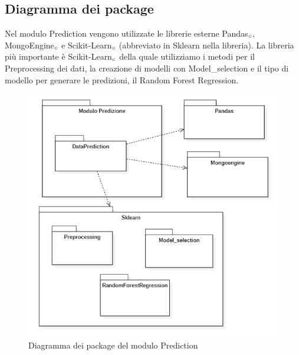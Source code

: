 \subsection{Diagramma dei package}\label{ArchitetturaDelProdottoArchitetturaModuloPredictionDiagrammaDeiPackage}
Nel modulo Prediction vengono utilizzate le librerie esterne Pandas$_{\scaleto{G}{3pt}}$, MongoEngine$_{\scaleto{G}{3pt}}$ e Scikit-Learn$_{\scaleto{G}{3pt}}$ (abbreviato in Sklearn nella libreria). La libreria più importante è Scikit-Learn$_{\scaleto{G}{3pt}}$ della quale utilizziamo i metodi per il Preprocessing dei dati, la creazione di modelli con Model\_selection e il tipo di modello per generare le predizioni, il Random Forest Regression.
\begin{figure}[H]
  \begin{center}
    \includegraphics[scale=0.8]{../immagini/diag_PB/diag_pack_pred.png}
    \caption{Diagramma dei package del modulo Prediction}
  \end{center}
\end{figure}


